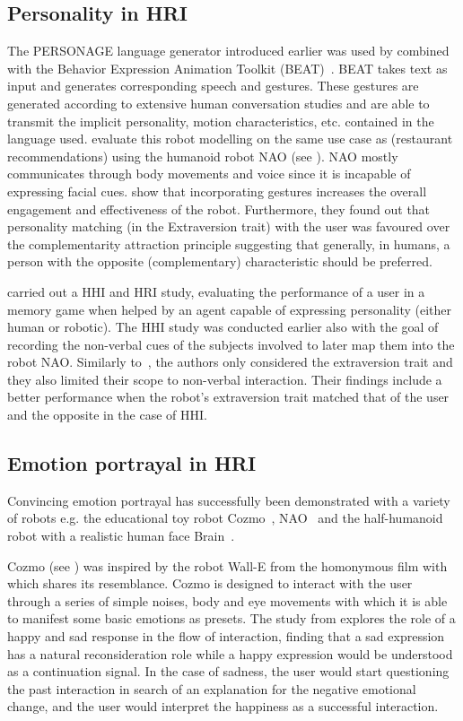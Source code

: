 \documentclass[nomenclature, english, biblatex]{kththesis}
\begin{document}
\subsection{Personality in HRI}
The PERSONAGE language generator introduced earlier was used by \textcite{aly2013model} combined with the Behavior Expression Animation Toolkit (BEAT)~\cite{beat}. BEAT takes text as input and generates corresponding speech and gestures. These gestures are generated according to extensive human conversation studies and are able to transmit the implicit personality, motion characteristics, etc. contained in the language used. \textcite{aly2013model} evaluate this robot modelling on the same use case as \textcite{mairesse2007personage} (restaurant recommendations) using the humanoid robot NAO (see ). NAO mostly communicates through body movements and voice since it is incapable of expressing facial cues. \textcite{aly2013model} show that incorporating gestures increases the overall engagement and effectiveness of the robot. Furthermore, they found out that personality matching (in the Extraversion trait) with the user was favoured over the complementarity attraction principle suggesting that generally, in humans, a person with the opposite (complementary) characteristic should be preferred.

\textcite{andriella2020have} carried out a \gls{HHI} and \gls{HRI} study, evaluating the performance of a user in a memory game when helped by an agent capable of expressing personality (either human or robotic). The HHI study was conducted earlier also with the goal of recording the non-verbal cues of the subjects involved to later map them into the robot NAO. Similarly to~\cite{mairesse2007personage}, the authors only considered the extraversion trait and they also limited their scope to non-verbal interaction. Their findings include a better performance when the robot's extraversion trait matched that of the user and the opposite in the case of HHI.

\subsection{Emotion portrayal in HRI}
Convincing emotion portrayal has successfully been demonstrated with a variety of robots e.g. the educational toy robot Cozmo~\cite{cozmoEmotions}, NAO~\cite{desire} and the half-humanoid robot with a realistic human face Brain~\cite{brianEmotions}.

Cozmo (see ) was inspired by the robot Wall-E from the homonymous film with which shares its resemblance. Cozmo is designed to interact with the user through a series of simple noises, body and eye movements with which it is able to manifest some basic emotions as presets. The study from \textcite{cozmoEmotions} explores the role of a happy and sad response in the flow of interaction, finding that a sad expression has a natural reconsideration role while a happy expression would be understood as a continuation signal. In the case of sadness, the user would start questioning the past interaction in search of an explanation for the negative emotional change, and the user would interpret the happiness as a successful interaction. 
\end{document}
